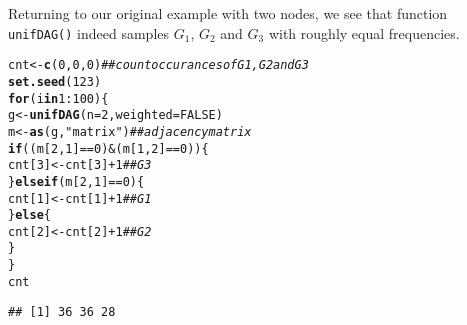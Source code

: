 \documentclass[11pt]{article}\usepackage[]{graphicx}\usepackage[]{color}
\makeatletter
\newcommand{\hlnum}[1]{\textcolor[rgb]{0.686,0.059,0.569}{#1}}%
\newcommand{\hlstr}[1]{\textcolor[rgb]{0.192,0.494,0.8}{#1}}%
\newcommand{\hlcom}[1]{\textcolor[rgb]{0.678,0.584,0.686}{\textit{#1}}}%
\newcommand{\hlopt}[1]{\textcolor[rgb]{0,0,0}{#1}}%
\newcommand{\hlstd}[1]{\textcolor[rgb]{0.345,0.345,0.345}{#1}}%
\newcommand{\hlkwa}[1]{\textcolor[rgb]{0.161,0.373,0.58}{\textbf{#1}}}%
\newcommand{\hlkwb}[1]{\textcolor[rgb]{0.69,0.353,0.396}{#1}}%
\newcommand{\hlkwc}[1]{\textcolor[rgb]{0.333,0.667,0.333}{#1}}%
\newcommand{\hlkwd}[1]{\textcolor[rgb]{0.737,0.353,0.396}{\textbf{#1}}}%
\newenvironment{kframe}{%
 \def\at@end@of@kframe{}%
 \ifinner\ifhmode%
  \def\at@end@of@kframe{\end{minipage}}%
  \begin{minipage}{\columnwidth}%
 \fi\fi%
 \def\FrameCommand##1{\hskip\@totalleftmargin \hskip-\fboxsep
 \colorbox{shadecolor}{##1}\hskip-\fboxsep
     \hskip-\linewidth \hskip-\@totalleftmargin \hskip\columnwidth}%
 \MakeFramed {\advance\hsize-\width
   \@totalleftmargin\z@ \linewidth\hsize
   \@setminipage}}%
 {\par\unskip\endMakeFramed%
 \at@end@of@kframe}
\newenvironment{knitrout}{}{} %
\makeatother
\begin{document}
Returning to our original example with two nodes, we see that function \texttt{unifDAG()} indeed samples $G_1$, $G_2$ and $G_3$ with roughly equal frequencies.

\begin{knitrout}\small
{}\color{fgcolor}\begin{kframe}
\begin{alltt}
\hlstd{cnt} \hlkwb{<-} \hlkwd{c}\hlstd{(}\hlnum{0}\hlstd{,} \hlnum{0}\hlstd{,} \hlnum{0}\hlstd{)}  \hlcom{## count occurances of G1, G2 and G3}
\hlkwd{set.seed}\hlstd{(}\hlnum{123}\hlstd{)}
\hlkwa{for} \hlstd{(i} \hlkwa{in} \hlnum{1}\hlopt{:}\hlnum{100}\hlstd{) \{}
    \hlstd{g} \hlkwb{<-} \hlkwd{unifDAG}\hlstd{(}\hlkwc{n} \hlstd{=} \hlnum{2}\hlstd{,} \hlkwc{weighted} \hlstd{=} \hlnum{FALSE}\hlstd{)}
    \hlstd{m} \hlkwb{<-} \hlkwd{as}\hlstd{(g,} \hlstr{"matrix"}\hlstd{)}  \hlcom{## adjacency matrix}
    \hlkwa{if} \hlstd{((m[}\hlnum{2}\hlstd{,} \hlnum{1}\hlstd{]} \hlopt{==} \hlnum{0}\hlstd{)} \hlopt{&} \hlstd{(m[}\hlnum{1}\hlstd{,} \hlnum{2}\hlstd{]} \hlopt{==} \hlnum{0}\hlstd{)) \{}
        \hlstd{cnt[}\hlnum{3}\hlstd{]} \hlkwb{<-} \hlstd{cnt[}\hlnum{3}\hlstd{]} \hlopt{+} \hlnum{1}  \hlcom{## G3}
    \hlstd{\}} \hlkwa{else if} \hlstd{(m[}\hlnum{2}\hlstd{,} \hlnum{1}\hlstd{]} \hlopt{==} \hlnum{0}\hlstd{) \{}
        \hlstd{cnt[}\hlnum{1}\hlstd{]} \hlkwb{<-} \hlstd{cnt[}\hlnum{1}\hlstd{]} \hlopt{+} \hlnum{1}  \hlcom{## G1}
    \hlstd{\}} \hlkwa{else} \hlstd{\{}
        \hlstd{cnt[}\hlnum{2}\hlstd{]} \hlkwb{<-} \hlstd{cnt[}\hlnum{2}\hlstd{]} \hlopt{+} \hlnum{1}  \hlcom{## G2}
    \hlstd{\}}
\hlstd{\}}
\hlstd{cnt}
\end{alltt}
\begin{verbatim}
## [1] 36 36 28
\end{verbatim}
\end{kframe}
\end{knitrout}



\end{document}
